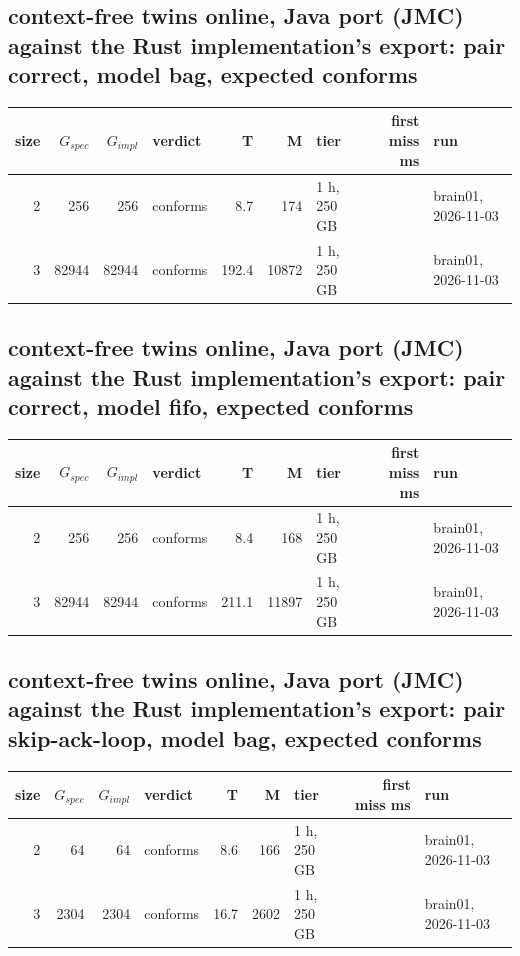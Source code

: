 \documentclass[10pt]{article}
\begin{document}
\subsection*{context-free twins online, Java port (JMC) against the Rust implementation's export: pair \textsf{correct}, model bag, expected conforms}
\begin{longtable}{@{}rrrlrrlrl@{}}
\toprule
size & $G_{\mathit{spec}}$ & $G_{\mathit{impl}}$ & verdict & T & M & tier & first miss ms & run \\
\midrule
\endhead
\color{blue} 2 & 256 & 256 & conforms & 8.7 & 174 & 1 h, 250 GB &  & brain01, 2026-11-03 \\
\color{blue} 3 & 82944 & 82944 & conforms & 192.4 & 10872 & 1 h, 250 GB &  & brain01, 2026-11-03 \\
\bottomrule
\end{longtable}
\subsection*{context-free twins online, Java port (JMC) against the Rust implementation's export: pair \textsf{correct}, model fifo, expected conforms}
\begin{longtable}{@{}rrrlrrlrl@{}}
\toprule
size & $G_{\mathit{spec}}$ & $G_{\mathit{impl}}$ & verdict & T & M & tier & first miss ms & run \\
\midrule
\endhead
\color{blue} 2 & 256 & 256 & conforms & 8.4 & 168 & 1 h, 250 GB &  & brain01, 2026-11-03 \\
\color{blue} 3 & 82944 & 82944 & conforms & 211.1 & 11897 & 1 h, 250 GB &  & brain01, 2026-11-03 \\
\bottomrule
\end{longtable}
\subsection*{context-free twins online, Java port (JMC) against the Rust implementation's export: pair \textsf{skip-ack-loop}, model bag, expected conforms}
\begin{longtable}{@{}rrrlrrlrl@{}}
\toprule
size & $G_{\mathit{spec}}$ & $G_{\mathit{impl}}$ & verdict & T & M & tier & first miss ms & run \\
\midrule
\endhead
\color{blue} 2 & 64 & 64 & conforms & 8.6 & 166 & 1 h, 250 GB &  & brain01, 2026-11-03 \\
\color{blue} 3 & 2304 & 2304 & conforms & 16.7 & 2602 & 1 h, 250 GB &  & brain01, 2026-11-03 \\
\bottomrule
\end{longtable}
\end{document}
